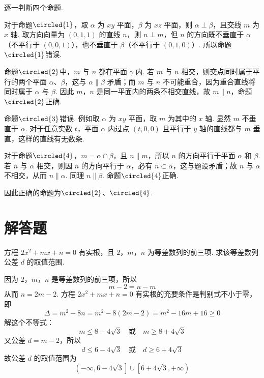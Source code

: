 \begin{solution}
逐一判断四个命题.

对于命题\(\circled{1}\)，取 \(\alpha\) 为 \(xy\) 平面，\(\beta\) 为 \(xz\) 平面，则 \(\alpha\perp\beta\)，且交线 \(m\) 为 \(x\) 轴. 取方向向量为 \((0,1,1)\) 的直线 \(n\)，则 \(n\perp m\)，但 \(n\) 的方向既不垂直于 \(\alpha\)（不平行于 \((0,0,1)\)），也不垂直于 \(\beta\)（不平行于 \((0,1,0)\)）. 所以命题\(\circled{1}\)错误.

命题\(\circled{2}\)中，\(m\) 与 \(n\) 都在平面 \(\gamma\) 内. 若 \(m\) 与 \(n\) 相交，则交点同时属于平行的两个平面 \(\alpha\)、\(\beta\)，这与 \(\alpha\parallel\beta\) 矛盾；而 \(m\) 与 \(n\) 不可能重合，因为重合直线将同时属于 \(\alpha\) 与 \(\beta\). 因此 \(m\)，\(n\) 是同一平面内的两条不相交直线，故 \(m\parallel n\)，命题\(\circled{2}\)正确.

命题\(\circled{3}\)错误. 例如取 \(\alpha\) 为 \(xy\) 平面，取 \(m\) 为其中的 \(x\) 轴. 显然 \(m\) 不垂直于 \(\alpha\). 对于任意实数 \(t\)，平面 \(\alpha\) 内过点 \((t,0,0)\) 且平行于 \(y\) 轴的直线都与 \(m\) 垂直，这样的直线有无数条.

对于命题\(\circled{4}\)，\(m=\alpha\cap\beta\)，且 \(n\parallel m\)，所以 \(n\) 的方向平行于平面 \(\alpha\) 和 \(\beta\). 若 \(n\) 与 \(\alpha\) 相交，则因 \(n\) 的方向平行于 \(\alpha\)，必有 \(n\subset\alpha\)，这与题设矛盾；故 \(n\) 与 \(\alpha\) 不相交，从而 \(n\parallel\alpha\). 同理 \(n\parallel\beta\). 命题\(\circled{4}\)正确.

因此正确的命题为\(\circled{2}\)、\(\circled{4}\).
\end{solution}

\section{解答题}
\begin{problem}
方程 \(2x^{2} + mx + n = 0\) 有实根，且 \(2\)，\(m\)，\(n\) 为等差数列的前三项. 求该等差数列公差 \(d\) 的取值范围.
\end{problem}

\begin{solution}
因为 \(2\)，\(m\)，\(n\) 是等差数列的前三项，所以
\[
m-2=n-m
\]
从而 \(n=2m-2\). 方程 \(2x^2+mx+n=0\) 有实根的充要条件是判别式不小于零，即
\[
\Delta=m^2-8n=m^2-8(2m-2)=m^2-16m+16\geqslant0
\]
解这个不等式：
\[
m\leqslant8-4\sqrt3\quad\text{或}\quad m\geqslant8+4\sqrt3
\]
又公差 \(d=m-2\)，所以
\[
d\leqslant6-4\sqrt3\quad\text{或}\quad d\geqslant6+4\sqrt3
\]
故公差 \(d\) 的取值范围为
\[
\left(-\infty,6-4\sqrt3\right]\cup\left[6+4\sqrt3,+\infty\right)
\]
\end{solution}

